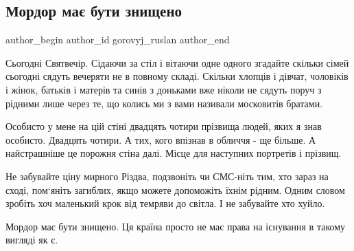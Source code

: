  
 
 
 
 
 
\subsection{Мордор має бути знищено}
\label{sec:06_01_2022.fb.gorovyj_ruslan.1.mordor_mae_buty_znyscheno}
 
\ifcmt
 author_begin
   author_id gorovyj_ruslan
 author_end
\fi

Сьогодні Святвечір. Сідаючи за стіл і вітаючи одне одного згадайте скільки
сімей сьогодні сядуть вечеряти не в повному складі. Скільки хлопців і дівчат,
чоловіків і жінок, батьків і матерів та синів з доньками вже ніколи не сядуть
поруч з рідними лише через те, що колись ми з вами називали московитів братами.


Особисто у мене на цій стіні двадцять чотири прізвища людей, яких я знав
особисто. Двадцять чотири. А тих, кого впізнав в обличчя - ще більше. А
найстрашніше це порожня стіна далі. Місце для наступних портретів і прізвищ.

Не забувайте ціну мирного Різдва, подзвоніть чи СМС-ніть тим, хто зараз на
сході, пом‘яніть загиблих, якщо можете допоможіть їхнім рідним. Одним словом
зробіть хоч маленький крок від темряви до світла. І не забувайте хто хуйло.

Мордор має бути знищено. Ця країна просто не має права на існування в такому
вигляді як є.

